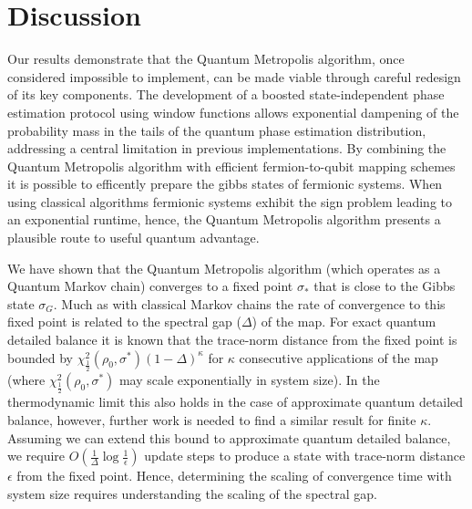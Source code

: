 \documentclass[aps,floatfix,10pt,amssymb,amsfont,amsmath,superscriptaddress,float,nofootinbib,longbibliography,nobalancelastpage,twocolumn]{revtex4-2}
\begin{document}


\section{Discussion}
\label{section:discussion}
Our results demonstrate that the Quantum Metropolis algorithm, once considered impossible to implement, can be made viable through careful redesign of its key components. The development of a boosted state-independent phase estimation protocol using window functions allows exponential dampening of the probability mass in the tails of the quantum phase estimation distribution, addressing a central limitation in previous implementations. By combining the Quantum Metropolis algorithm with efficient fermion-to-qubit mapping schemes \cite{} it is possible to efficently prepare the gibbs states of fermionic systems. When using classical algorithms fermionic systems exhibit the sign problem \cite{} leading to an exponential runtime, hence, the Quantum Metropolis algorithm presents a plausible route to useful quantum advantage.

We have shown that the Quantum Metropolis algorithm (which operates as a Quantum Markov chain) converges to a fixed point $\sigma_*$ that is close to the Gibbs state $\sigma_G$. Much as with classical Markov chains the rate of convergence to this fixed point is related to the spectral gap ($\Delta$) of the map. For exact quantum detailed balance it is known \cite{temme2010chi} that the trace-norm distance from the fixed point is bounded by $\chi^2_{\frac{1}{2}}(\rho_0,\sigma^*) (1-\Delta)^\kappa$ for $\kappa$ consecutive applications of the map (where $\chi^2_{\frac{1}{2}}(\rho_0,\sigma^*)$ may scale exponentially in system size). In the thermodynamic limit this also holds in the case of approximate quantum detailed balance, however, further work is needed to find a similar result for finite $\kappa$. Assuming we can extend this bound to approximate quantum detailed balance, we require $O(\frac{1}{\Delta}\log \frac{1}{\epsilon})$ update steps to produce a state with trace-norm distance $\epsilon$ from the fixed point. Hence, determining the scaling of convergence time with system size requires understanding the scaling of the spectral gap.
\end{document}
